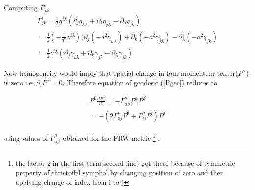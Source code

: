 \documentclass[12pt]{report}
\newcommand{\fn}[1]{\footnote{#1}}
\newcommand{\de}[2]{\frac{d{#1}}{d{#2}}}
\newcommand{\ch}[2]{\Gamma^{#1}_{#2}}
\newcommand{\p}{\partial}
\begin{document}
Computing $\ch{i}{jk}$
\begin{eqnarray*}
\ch{i}{j k}=\frac{1}{2}g^{i \lambda}(\p_{j} g_{k \lambda}+\p_k g_{j \lambda} - \p_\lambda g_{jk})\\
=\frac{1}{2}( - \frac{1}{a^2} \gamma^{i \lambda})(\p_{j} ( - {a^2} \gamma_{k \lambda})+\p_k ( - {a^2} \gamma_{j \lambda}) - \p_\lambda ( - {a^2} \gamma_{j k})\\
=\frac{1}{2} \gamma^{i \lambda}(\p_{j} \gamma_{k \lambda}+\p_k  \gamma_{j \lambda} - \p_\lambda  \gamma_{j k})
\end{eqnarray*}

Now homogeneity would imply that spatial change in four momentum tensor($P^{\alpha}$) is zero i.e. $\p_i P^\alpha=0$. Therefore equation of geodesic (\ref{Pgeo}) reduces to


\begin{eqnarray}
P^0 \de{P^\mu}{t}=-\ch{\mu}{\alpha \beta}P^{\alpha}P^{\beta}\\
= - (2 \ch{\mu}{0 j} P^0 + \ch{\mu}{i j}P^{i})P^j \label{FRWgeo}
\end{eqnarray}

using values of $\ch{\mu}{\alpha \beta}$ obtained for the FRW metric \fn{the factor 2 in the first term(second line) got there because of symmetric property of christoffel sympbol by changing position of zero and then applying change of index from i to j } .
\end{document}
